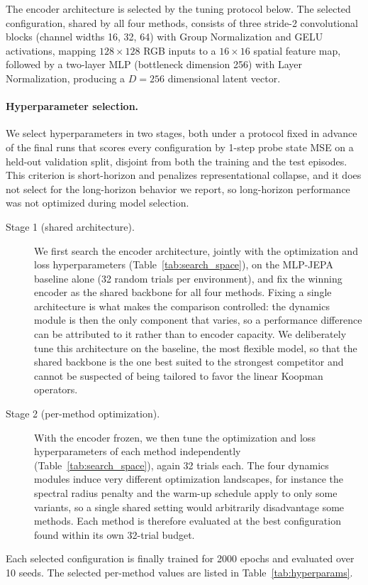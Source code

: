 \documentclass[10pt]{article} %
\begin{document}
The encoder architecture is selected by the tuning protocol below. The selected configuration, shared by all four methods, consists of three stride-2 convolutional blocks (channel widths 16, 32, 64) with Group Normalization and GELU activations, mapping $128{\times}128$ RGB inputs to a $16{\times}16$ spatial feature map, followed by a two-layer MLP (bottleneck dimension 256) with Layer Normalization, producing a $D{=}256$ dimensional latent vector.

\paragraph{Hyperparameter selection.} We select hyperparameters in two stages, both under a protocol fixed in advance of the final runs that scores every configuration by 1-step probe state MSE on a held-out validation split, disjoint from both the training and the test episodes. This criterion is short-horizon and penalizes representational collapse, and it does not select for the long-horizon behavior we report, so long-horizon performance was not optimized during model selection.
\begin{description}
\item[Stage 1 (shared architecture).] We first search the encoder architecture, jointly with the optimization and loss hyperparameters (Table~\ref{tab:search_space}), on the MLP-JEPA baseline alone (32 random trials per environment), and fix the winning encoder as the shared backbone for all four methods. Fixing a single architecture is what makes the comparison controlled: the dynamics module is then the only component that varies, so a performance difference can be attributed to it rather than to encoder capacity. We deliberately tune this architecture on the baseline, the most flexible model, so that the shared backbone is the one best suited to the strongest competitor and cannot be suspected of being tailored to favor the linear Koopman operators.
\item[Stage 2 (per-method optimization).] With the encoder frozen, we then tune the optimization and loss hyperparameters of each method independently (Table~\ref{tab:search_space}), again 32 trials each. The four dynamics modules induce very different optimization landscapes, for instance the spectral radius penalty and the warm-up schedule apply to only some variants, so a single shared setting would arbitrarily disadvantage some methods. Each method is therefore evaluated at the best configuration found within its own 32-trial budget.
\end{description}
Each selected configuration is finally trained for 2000 epochs and evaluated over 10 seeds. The selected per-method values are listed in Table~\ref{tab:hyperparams}.
\end{document}
